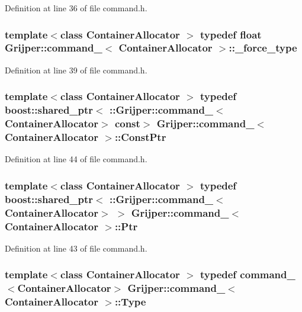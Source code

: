Definition at line 36 of file command.\-h.

\subsubsection[{\-\_\-force\-\_\-type}]{\setlength{\rightskip}{0pt plus 5cm}template$<$class Container\-Allocator $>$ typedef float {\bf Grijper\-::command\-\_\-}$<$ Container\-Allocator $>$\-::{\bf \-\_\-force\-\_\-type}}\label{structGrijper_1_1command___a7ba46dabfd6b1c5ea4955f3875b86ce0}


Definition at line 39 of file command.\-h.

\subsubsection[{Const\-Ptr}]{\setlength{\rightskip}{0pt plus 5cm}template$<$class Container\-Allocator $>$ typedef boost\-::shared\-\_\-ptr$<$ \-::{\bf Grijper\-::command\-\_\-}$<$Container\-Allocator$>$ const$>$ {\bf Grijper\-::command\-\_\-}$<$ Container\-Allocator $>$\-::{\bf Const\-Ptr}}\label{structGrijper_1_1command___a1abbeec38dd1d37c4960ce01a9993aaf}


Definition at line 44 of file command.\-h.

\subsubsection[{Ptr}]{\setlength{\rightskip}{0pt plus 5cm}template$<$class Container\-Allocator $>$ typedef boost\-::shared\-\_\-ptr$<$ \-::{\bf Grijper\-::command\-\_\-}$<$Container\-Allocator$>$ $>$ {\bf Grijper\-::command\-\_\-}$<$ Container\-Allocator $>$\-::{\bf Ptr}}\label{structGrijper_1_1command___ab58cfe639128f32e0777d54b7eea3fe1}


Definition at line 43 of file command.\-h.

\subsubsection[{Type}]{\setlength{\rightskip}{0pt plus 5cm}template$<$class Container\-Allocator $>$ typedef {\bf command\-\_\-}$<$Container\-Allocator$>$ {\bf Grijper\-::command\-\_\-}$<$ Container\-Allocator $>$\-::{\bf Type}}\label{structGrijper_1_1command___a6b6cd707b5ac6695758b0585569ddac2}


